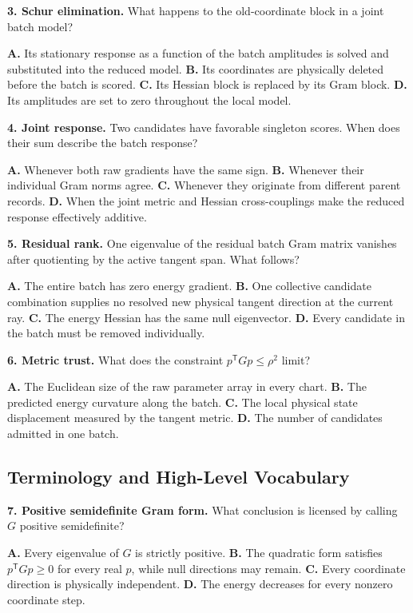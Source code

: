 \documentclass[10pt,twocolumn]{article}
\begin{document}
\textbf{3. Schur elimination.}
What happens to the old-coordinate block in a joint batch model?

\textbf{A.} Its stationary response as a function of the batch amplitudes is
solved and substituted into the reduced model.\quad
\textbf{B.} Its coordinates are physically deleted before the batch is
scored.\quad
\textbf{C.} Its Hessian block is replaced by its Gram block.\quad
\textbf{D.} Its amplitudes are set to zero throughout the local model.

\textbf{4. Joint response.}
Two candidates have favorable singleton scores. When does their sum describe
the batch response?

\textbf{A.} Whenever both raw gradients have the same sign.\quad
\textbf{B.} Whenever their individual Gram norms agree.\quad
\textbf{C.} Whenever they originate from different parent records.\quad
\textbf{D.} When the joint metric and Hessian cross-couplings make the reduced
response effectively additive.

\textbf{5. Residual rank.}
One eigenvalue of the residual batch Gram matrix vanishes after quotienting by
the active tangent span. What follows?

\textbf{A.} The entire batch has zero energy gradient.\quad
\textbf{B.} One collective candidate combination supplies no resolved new
physical tangent direction at the current ray.\quad
\textbf{C.} The energy Hessian has the same null eigenvector.\quad
\textbf{D.} Every candidate in the batch must be removed individually.

\textbf{6. Metric trust.}
What does the constraint \(p^{\mathsf T}Gp\leq\rho^2\) limit?

\textbf{A.} The Euclidean size of the raw parameter array in every chart.\quad
\textbf{B.} The predicted energy curvature along the batch.\quad
\textbf{C.} The local physical state displacement measured by the tangent
metric.\quad
\textbf{D.} The number of candidates admitted in one batch.

\subsection*{Terminology and High-Level Vocabulary}

\textbf{7. Positive semidefinite Gram form.}
What conclusion is licensed by calling \(G\) positive semidefinite?

\textbf{A.} Every eigenvalue of \(G\) is strictly positive.\quad
\textbf{B.} The quadratic form satisfies \(p^{\mathsf T}Gp\geq0\) for every
real \(p\), while null directions may remain.\quad
\textbf{C.} Every coordinate direction is physically independent.\quad
\textbf{D.} The energy decreases for every nonzero coordinate step.
\end{document}
